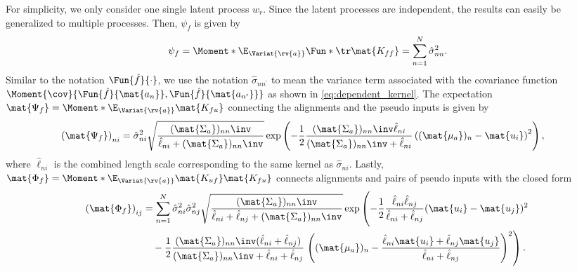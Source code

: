 \documentclass{article}
\begin{document}
For simplicity, we only consider one single latent process $w_r$.
Since the latent processes are independent, the results can easily be generalized to multiple processes.
Then, $\psi_f$ is given by
\begin{align}
    \label{eq:psi0}
    \psi_f = \Moment*{\E_{\Variat{\rv{a}}}}{\Fun*{\tr}{\mat{K_{ff}}}} = \sum_{n=1}^N \hat{\sigma}_{nn}^2.
\end{align}
Similar to the notation $\Fun{\hat{f}}{\cdot}$, we use the notation $\hat{\sigma}_{nn^\prime}$ to mean the variance term associated with the covariance function $\Moment{\cov}{\Fun{\hat{f}}{\mat{a_n}}, \Fun{\hat{f}}{\mat{a_{n^\prime}}}}$ as shown in \cref{eq:dependent_kernel}.
The expectation $\mat{\Psi_f} = \Moment*{\E_{\Variat{\rv{a}}}}{\mat{K_{fu}}}$ connecting the alignments and the pseudo inputs is given by
\begin{align}
    \label{eq:psi1}
\begin{split}
    \left( \mat{\Psi_f} \right)_{ni} &= \hat{\sigma}_{ni}^2 \sqrt{\frac{(\mat{\Sigma_a})_{nn}\inv}{\hat{\ell}_{ni} + (\mat{\Sigma_a})_{nn}\inv}}
    \exp\left(-\frac{1}{2} \frac{(\mat{\Sigma_a})_{nn}\inv\hat{\ell}_{ni}}{(\mat{\Sigma_a})_{nn}\inv + \hat{\ell}_{ni}} \left((\mat{\mu_a})_n - \mat{u_i}\right)^2\right),
\end{split}
\end{align}
where $\hat{\ell}_{ni}$ is the combined length scale corresponding to the same kernel as $\hat{\sigma}_{ni}$.
Lastly, $\mat{\Phi_f} = \Moment*{\E_{\Variat{\rv{a}}}}{\mat{K_{uf}}\mat{K_{fu}}}$ connects alignments and pairs of pseudo inputs with the closed form
\begin{align}
    \label{eq:psi2}
\begin{split}
    \left( \mat{\Phi_f} \right)_{ij} &= \sum_{n=1}^N \hat{\sigma}_{ni}^2 \hat{\sigma}_{nj}^2 \sqrt{\frac{(\mat{\Sigma_a})_{nn}\inv}{\hat{\ell}_{ni} + \hat{\ell}_{nj} + (\mat{\Sigma_a})_{nn}\inv}}
    \exp\left( -\frac{1}{2} \vphantom{\left(\frac{\hat{\ell}}{\hat{\ell}}\right)^2} \frac{\hat{\ell}_{ni}\hat{\ell}_{nj}}{\hat{\ell}_{ni} + \hat{\ell}_{nj}} (\mat{u_i} - \mat{u_j})^2 \right. \\
    &\quad {} - \frac{1}{2} \frac{(\mat{\Sigma_a})_{nn}\inv(\hat{\ell}_{ni} + \hat{\ell}_{nj})}{(\mat{\Sigma_a})_{nn}\inv + \hat{\ell}_{ni} + \hat{\ell}_{nj}}
    \left.\left( (\mat{\mu_a})_n - \frac{\hat{\ell}_{ni} \mat{u_i} + \hat{\ell}_{nj} \mat{u_j}}{\hat{\ell}_{ni} + \hat{\ell}_{nj}} \right)^2 \right).
\end{split}
\end{align}
\end{document}
